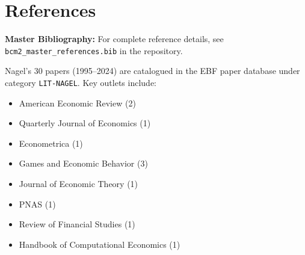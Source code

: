 \section{References}

\begin{tcolorbox}[colback=blue!5!white, colframe=blue!75!black]
\textbf{Master Bibliography:} For complete reference details, see
\texttt{bcm2\_master\_references.bib} in the repository.
\end{tcolorbox}

\nocite{bcm_master}

Nagel's 30 papers (1995--2024) are catalogued in the EBF paper database
under category \texttt{LIT-NAGEL}. Key outlets include:
\begin{itemize}[nosep]
    \item American Economic Review (2)
    \item Quarterly Journal of Economics (1)
    \item Econometrica (1)
    \item Games and Economic Behavior (3)
    \item Journal of Economic Theory (1)
    \item PNAS (1)
    \item Review of Financial Studies (1)
    \item Handbook of Computational Economics (1)
\end{itemize}



